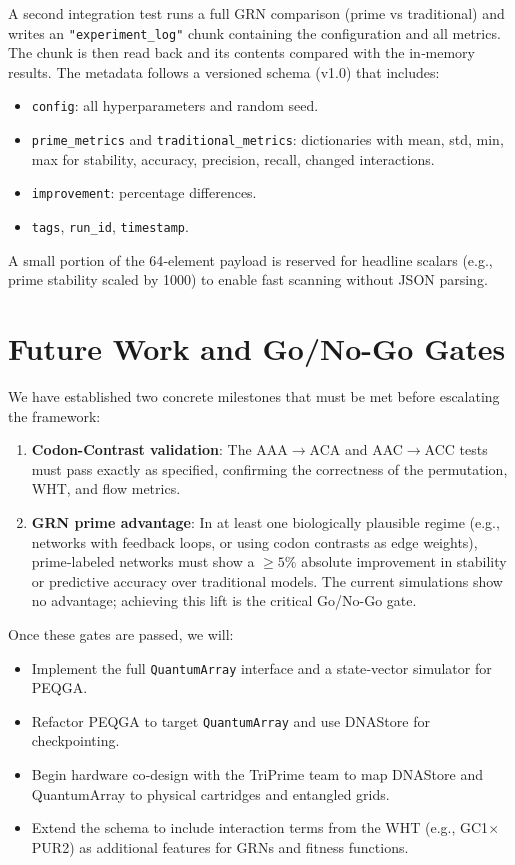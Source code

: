 \documentclass[12pt]{article}
\begin{document}
A second integration test runs a full GRN comparison (prime vs traditional) and writes an \texttt{"experiment\_log"} chunk containing the configuration and all metrics. The chunk is then read back and its contents compared with the in‑memory results. The metadata follows a versioned schema (v1.0) that includes:
\begin{itemize}
    \item \texttt{config}: all hyperparameters and random seed.
    \item \texttt{prime\_metrics} and \texttt{traditional\_metrics}: dictionaries with mean, std, min, max for stability, accuracy, precision, recall, changed interactions.
    \item \texttt{improvement}: percentage differences.
    \item \texttt{tags}, \texttt{run\_id}, \texttt{timestamp}.
\end{itemize}
A small portion of the 64‑element payload is reserved for headline scalars (e.g., prime stability scaled by 1000) to enable fast scanning without JSON parsing.

\section{Future Work and Go/No-Go Gates}
\label{sec:future}

We have established two concrete milestones that must be met before escalating the framework:

\begin{enumerate}
    \item \textbf{Codon-Contrast validation}: The AAA$\to$ACA and AAC$\to$ACC tests must pass exactly as specified, confirming the correctness of the permutation, WHT, and flow metrics.
    \item \textbf{GRN prime advantage}: In at least one biologically plausible regime (e.g., networks with feedback loops, or using codon contrasts as edge weights), prime‑labeled networks must show a $\ge 5\%$ absolute improvement in stability or predictive accuracy over traditional models. The current simulations show no advantage; achieving this lift is the critical Go/No-Go gate.
\end{enumerate}

Once these gates are passed, we will:
\begin{itemize}
    \item Implement the full \texttt{QuantumArray} interface and a state‑vector simulator for PEQGA.
    \item Refactor PEQGA to target \texttt{QuantumArray} and use DNAStore for checkpointing.
    \item Begin hardware co‑design with the TriPrime team to map DNAStore and QuantumArray to physical cartridges and entangled grids.
    \item Extend the schema to include interaction terms from the WHT (e.g., GC1$\times$PUR2) as additional features for GRNs and fitness functions.
\end{itemize}
\end{document}
